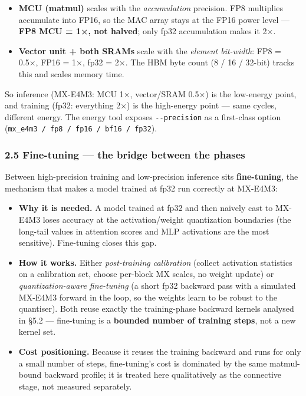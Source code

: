 \documentclass[
  10pt,
]{article}
\providecommand{\tightlist}{%
  \setlength{\itemsep}{0pt}\setlength{\parskip}{0pt}}
\begin{document}
\begin{itemize}
\tightlist
\item
  \textbf{MCU (matmul)} scales with the \emph{accumulation} precision. FP8
  multiplies accumulate into FP16, so the MAC array stays at the FP16 power
  level — \textbf{FP8 MCU = 1×, not halved}; only fp32 accumulation makes
  it 2×.
\item
  \textbf{Vector unit + both SRAMs} scale with the \emph{element bit-width}:
  FP8 = 0.5×, FP16 = 1×, fp32 = 2×. The HBM byte count (8 / 16 / 32-bit)
  tracks this and scales memory time.
\end{itemize}

So inference (MX-E4M3: MCU 1×, vector/SRAM 0.5×) is the low-energy point,
and training (fp32: everything 2×) is the high-energy point — same cycles,
different energy. The energy tool exposes \texttt{-{}-precision} as a
first-class option (\texttt{mx\_e4m3 / fp8 / fp16 / bf16 / fp32}).

\subsubsection{2.5 Fine-tuning --- the bridge between the
phases}\label{fine-tuning-bridge}

Between high-precision training and low-precision inference sits
\textbf{fine-tuning}, the mechanism that makes a model trained at fp32
run correctly at MX-E4M3:

\begin{itemize}
\tightlist
\item
  \textbf{Why it is needed.} A model trained at fp32 and then naively
  cast to MX-E4M3 loses accuracy at the activation/weight quantization
  boundaries (the long-tail values in attention scores and MLP
  activations are the most sensitive). Fine-tuning closes this gap.
\item
  \textbf{How it works.} Either \emph{post-training calibration} (collect
  activation statistics on a calibration set, choose per-block MX scales,
  no weight update) or \emph{quantization-aware fine-tuning} (a short
  fp32 backward pass with a simulated MX-E4M3 forward in the loop, so the
  weights learn to be robust to the quantiser). Both reuse exactly the
  training-phase backward kernels analysed in §5.2 --- fine-tuning is a
  \textbf{bounded number of training steps}, not a new kernel set.
\item
  \textbf{Cost positioning.} Because it reuses the training backward and
  runs for only a small number of steps, fine-tuning's cost is dominated
  by the same matmul-bound backward profile; it is treated here
  qualitatively as the connective stage, not measured separately.
\end{itemize}
\end{document}
